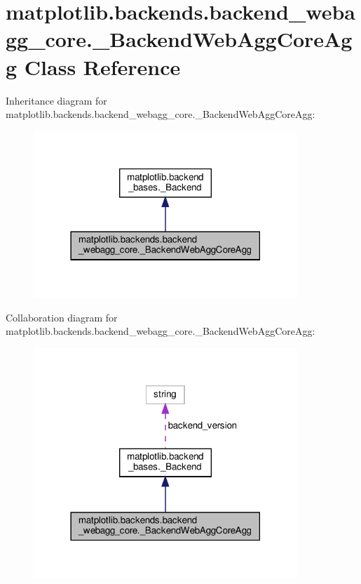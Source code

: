 \hypertarget{classmatplotlib_1_1backends_1_1backend__webagg__core_1_1__BackendWebAggCoreAgg}{}\section{matplotlib.\+backends.\+backend\+\_\+webagg\+\_\+core.\+\_\+\+Backend\+Web\+Agg\+Core\+Agg Class Reference}
\label{classmatplotlib_1_1backends_1_1backend__webagg__core_1_1__BackendWebAggCoreAgg}


Inheritance diagram for matplotlib.\+backends.\+backend\+\_\+webagg\+\_\+core.\+\_\+\+Backend\+Web\+Agg\+Core\+Agg\+:
\nopagebreak
\begin{figure}[H]
\begin{center}
\leavevmode
\includegraphics[width=282pt]{classmatplotlib_1_1backends_1_1backend__webagg__core_1_1__BackendWebAggCoreAgg__inherit__graph}
\end{center}
\end{figure}


Collaboration diagram for matplotlib.\+backends.\+backend\+\_\+webagg\+\_\+core.\+\_\+\+Backend\+Web\+Agg\+Core\+Agg\+:
\nopagebreak
\begin{figure}[H]
\begin{center}
\leavevmode
\includegraphics[width=282pt]{classmatplotlib_1_1backends_1_1backend__webagg__core_1_1__BackendWebAggCoreAgg__coll__graph}
\end{center}
\end{figure}
